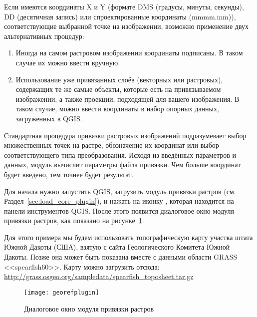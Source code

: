 
Если имеются координаты X и Y (формате DMS (градусы, минуты,
секунды), DD (десятичная запись) или спроектированные координаты
(mmmm.mm)), соответствующие выбранной точке на изображении, возможно
применение двух альтернативных процедур:

\begin{enumerate}
\item Иногда на самом растровом изображении координаты подписаны.
В таком случае их можно ввести вручную.
\item Использование уже привязанных слоёв (векторных или растровых),
содержащих те же самые объекты, которые есть на привязываемом
изображении, а также проекции, подходящей для вашего изображения.
В таком случае, можно ввести координаты в набор опорных данных,
загруженных в QGIS.
\end{enumerate}

Стандартная процедура привязки растровых изображений подразумевает выбор
множественных точек на растре, обозначение их координат или выбор
соответствующего типа преобразования. Исходя из введённых параметров и
данных, модуль вычислит параметры файла привязки. Чем больше координат
будет введено, тем точнее будет результат.

Для начала нужно запустить QGIS, загрузить модуль привязки растров
(см. Раздел~\ref{sec:load_core_plugin}), и нажать на иконку
, которая находится на
панели инструментов QGIS. После этого появится диалоговое окно модуля
привязки растров, как показано на рисунке~\ref{fig:georefplugin}.

Для этого примера мы будем использовать топографическую карту участка штата Южной
Дакоты (США), взятую с сайта Геологического Комитета Южной Дакоты. Позже она
может быть показана вместе с данными области GRASS <<spearfish60>>. Карту
можно загрузить отсюда:
\url{http://grass.osgeo.org/sampledata/spearfish_toposheet.tar.gz}

\begin{figure}[ht]
\centering
  \texttt{[image: georefplugin]}
  \caption{Диалоговое окно модуля привязки растров \wincaption}\label{fig:georefplugin}
\end{figure}

\label{georeferencer_entering}

